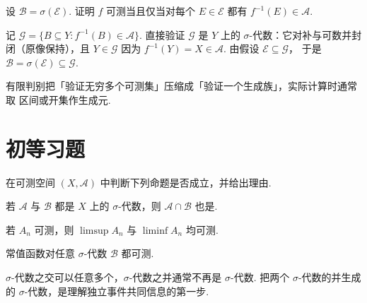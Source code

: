 \begin{example}[可测性的有限判别]
设 $\mathcal{B}=\sigma(\mathcal{E})$. 证明 $f$ 可测当且仅当对每个 $E\in\mathcal{E}$
都有 $f^{-1}(E)\in\mathcal{A}$.
\end{example}

\begin{solution}
记 $\mathcal{G}=\{B\subseteq Y:f^{-1}(B)\in\mathcal{A}\}$. 直接验证 $\mathcal{G}$ 是
$Y$ 上的 $\sigma$-代数：它对补与可数并封闭（原像保持），且 $Y\in\mathcal{G}$
因为 $f^{-1}(Y)=X\in\mathcal{A}$. 由假设 $\mathcal{E}\subseteq\mathcal{G}$，
于是 $\mathcal{B}=\sigma(\mathcal{E})\subseteq\mathcal{G}$.
\end{solution}

\begin{remark}
有限判别把「验证无穷多个可测集」压缩成「验证一个生成族」，实际计算时通常取
区间或开集作生成元.
\end{remark}

\section{初等习题}

\begin{exercises}
在可测空间 $(X,\mathcal{A})$ 中判断下列命题是否成立，并给出理由.
\end{exercises}

\begin{exercise}
若 $\mathcal{A}$ 与 $\mathcal{B}$ 都是 $X$ 上的 $\sigma$-代数，则 $\mathcal{A}\cap\mathcal{B}$ 也是.
\end{exercise}
\begin{exercise}
若 $A_n$ 可测，则 $\limsup A_n$ 与 $\liminf A_n$ 均可测.
\end{exercise}
\begin{exercise}
常值函数对任意 $\sigma$-代数 $\mathcal{B}$ 都可测.
\end{exercise}

\begin{analysispath}
$\sigma$-代数之交可以任意多个，$\sigma$-代数之并通常不再是 $\sigma$-代数.
把两个 $\sigma$-代数的并生成的 $\sigma$-代数，是理解独立事件共同信息的第一步.
\end{analysispath}
